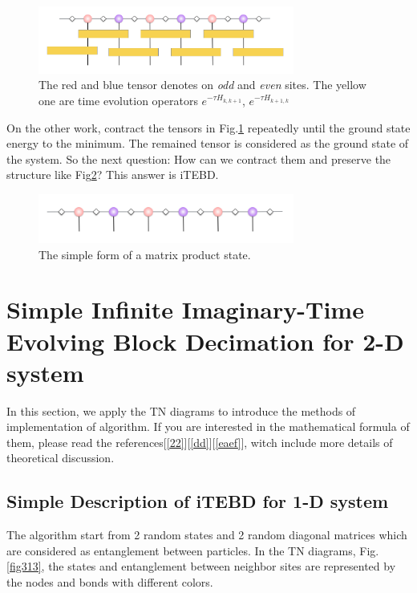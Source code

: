 \begin{figure}[ht]
	\centering
	\includegraphics[width=0.75\textwidth]{figures/fig312.png}
	\caption[The picture of the main idea of itebd.]{The red and blue tensor denotes on \textit{odd} and \textit{even} sites. The yellow one are time evolution operators $e^{-\tau H_{k,k+1}}$, $e^{-\tau H_{k+1,k}}$}
	\label{fig312}
\end{figure}

On the other work, contract the tensors in Fig.\ref{fig312} repeatedly until the ground state energy to the minimum. The remained tensor is considered as the ground state of the system. So the next question: How can we contract them and preserve the structure like Fig{\ref{fig311}}? This answer is iTEBD.

\begin{figure}[ht]
	\centering
	\includegraphics[width=0.75\textwidth]{figures/fig311.png}
	\caption[The picture of matrix product states]{The simple form of a matrix product state.}
	\label{fig311}
\end{figure}

\section{Simple Infinite Imaginary-Time Evolving Block Decimation for 2-D system}
In this section, we apply the TN diagrams to introduce the methods of implementation of algorithm. If you are interested in the mathematical formula of them, please read the references[\ref{22}][\ref{dd}][\ref{eaef}], witch include more details of theoretical discussion.

\label{itebd}
\subsection{Simple Description of iTEBD for 1-D system}

The algorithm start from 2 random states and 2 random diagonal matrices which are considered as entanglement between particles. In the TN diagrams, Fig.\ref{fig313}, the states and entanglement between neighbor sites are represented by the nodes and bonds with different colors.


